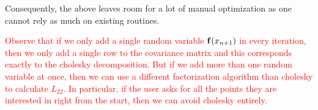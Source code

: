 Consequently, the above leaves room for a lot of manual optimization as one cannot
rely as much on existing routines.

\textcolor{red}{Observe that if we only add a single random variable \(\mathbf{f}(x_{n+1})\)
in every iteration, then we only add a single row to the covariance matrix and
this corresponds exactly to the cholesky decomposition. But if we add more than
one random variable at once, then we can use a different factorization algorithm
than cholesky to calculate \(L_{22}\). In particular, if the user asks for all the points
they are interested in right from the start, then we can avoid cholesky entirely.
}

